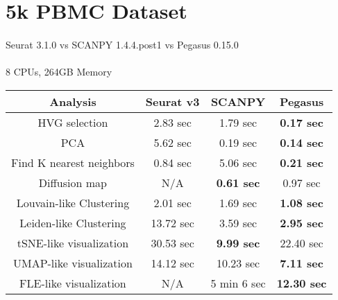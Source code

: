\documentclass[10pt]{article}
\begin{document}
\section{5k PBMC Dataset}

\paragraph{}
Seurat 3.1.0 \qquad vs \qquad SCANPY 1.4.4.post1 \qquad vs \qquad Pegasus 0.15.0

\paragraph{}
8 CPUs, 264GB Memory

\begin{table}[H]
	\centering
	\begin{tabular}{|c|c|c|c|}
		\hline
		Analysis & Seurat v3 & SCANPY & Pegasus\\
		\hline \hline
		HVG selection & 2.83 sec  & 1.79 sec & \textbf{0.17 sec}  \\
		\hline
		PCA & 5.62 sec & 0.19 sec & \textbf{0.14 sec}  \\
		\hline
		Find K nearest neighbors & 0.84 sec & 5.06 sec & \textbf{0.21 sec } \\
		\hline
		Diffusion map & N/A & \textbf{0.61 sec} & 0.97 sec  \\
		\hline
		Louvain-like Clustering & 2.01 sec & 1.69 sec & \textbf{1.08 sec} \\
		\hline 
		Leiden-like Clustering & 13.72 sec & 3.59 sec & \textbf{2.95 sec} \\
		\hline
		tSNE-like visualization & 30.53 sec & \textbf{9.99 sec} & 22.40 sec  \\
		\hline
		UMAP-like visualization & 14.12 sec & 10.23 sec & \textbf{7.11 sec} \\
		\hline
		FLE-like visualization & N/A & 5 min 6 sec & \textbf{12.30 sec} \\
		\hline
	\end{tabular}
\end{table}
\end{document}
